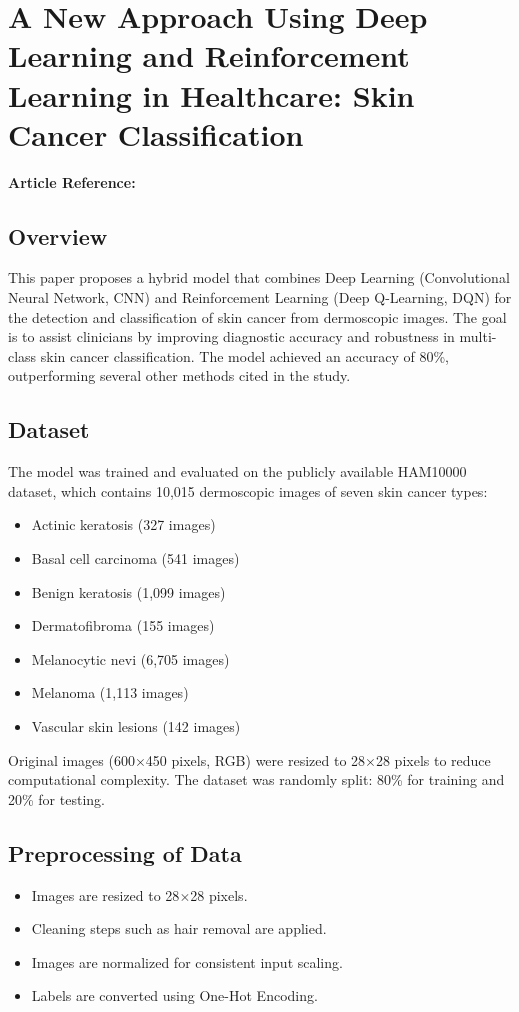 \section{A New Approach Using Deep Learning and Reinforcement Learning in Healthcare: Skin Cancer Classification}
\textbf{Article Reference:} \cite{dahdouhNewApproachUsing2023}

\subsection*{Overview}
This paper proposes a hybrid model that combines Deep Learning (Convolutional Neural Network, CNN) and Reinforcement Learning (Deep Q-Learning, DQN) for the detection and classification of skin cancer from dermoscopic images. The goal is to assist clinicians by improving diagnostic accuracy and robustness in multi-class skin cancer classification. The model achieved an accuracy of 80\%, outperforming several other methods cited in the study.

\subsection*{Dataset}
The model was trained and evaluated on the publicly available HAM10000 dataset, which contains 10,015 dermoscopic images of seven skin cancer types:
\begin{itemize}
    \item Actinic keratosis (327 images)
    \item Basal cell carcinoma (541 images)
    \item Benign keratosis (1,099 images)
    \item Dermatofibroma (155 images)
    \item Melanocytic nevi (6,705 images)
    \item Melanoma (1,113 images)
    \item Vascular skin lesions (142 images)
\end{itemize}
Original images (600$\times$450 pixels, RGB) were resized to 28$\times$28 pixels to reduce computational complexity. The dataset was randomly split: 80\% for training and 20\% for testing.

\subsection*{Preprocessing of Data}
\begin{itemize}
    \item Images are resized to 28$\times$28 pixels.
    \item Cleaning steps such as hair removal are applied.
    \item Images are normalized for consistent input scaling.
    \item Labels are converted using One-Hot Encoding.
\end{itemize}

